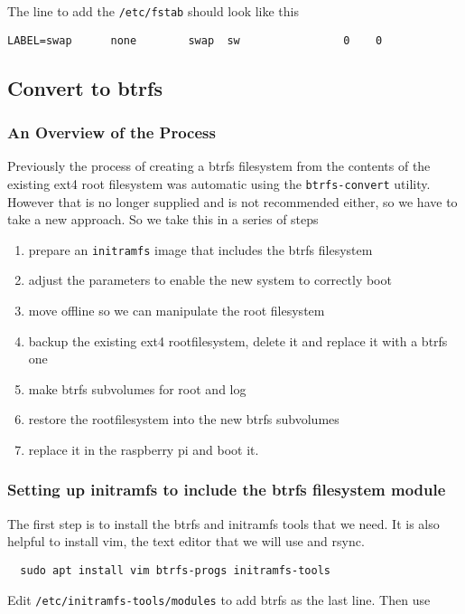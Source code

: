 \documentclass[Draft]{akc}
\begin{document}
The line to add the \texttt{/etc/fstab} should look like this
\begin{lstlisting}
LABEL=swap      none        swap  sw                0    0
\end{lstlisting}


\subsection{Convert to btrfs}
\subsubsection{An Overview of the Process}
Previously the process of creating a btrfs filesystem from the contents of the existing ext4 root filesystem was
automatic using the \texttt{btrfs-convert} utility.  However that is no longer supplied and is not recommended either,
so we have to take a new approach.  So we take this in a series of steps
\begin{enumerate}
  \item prepare an \texttt{initramfs} image that includes the btrfs filesystem
  \item adjust the parameters to enable the new system to correctly boot
  \item move offline so we can manipulate the root filesystem
  \item backup the existing ext4 rootfilesystem, delete it and replace it with a btrfs one
  \item make btrfs subvolumes for root and log
  \item restore the rootfilesystem into the new btrfs subvolumes
  \item replace it in the raspberry pi and boot it.
\end{enumerate}

\subsubsection{Setting up initramfs to include the btrfs filesystem module}

The first step is to install the btrfs and initramfs tools that we need. It is also helpful to
install vim, the text editor that we will use and rsync.

\begin{lstlisting}
  sudo apt install vim btrfs-progs initramfs-tools
\end{lstlisting}

Edit \texttt{/etc/initramfs-tools/modules} to add btrfs as the last line. Then use
\end{document}
